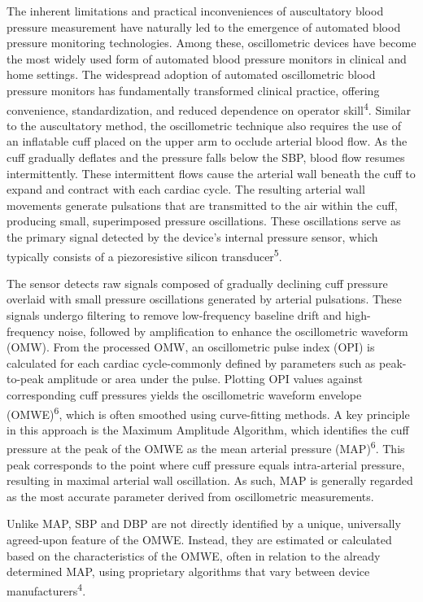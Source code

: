 \documentclass[
  12pt,
  letterpaper,
  openany,
  oneside]{book}
\begin{document}
The inherent limitations and practical inconveniences of auscultatory
blood pressure measurement have naturally led to the emergence of
automated blood pressure monitoring technologies. Among these,
oscillometric devices have become the most widely used form of automated
blood pressure monitors in clinical and home settings. The widespread
adoption of automated oscillometric blood pressure monitors has
fundamentally transformed clinical practice, offering convenience,
standardization, and reduced dependence on operator
skill\textsuperscript{4}. Similar to the auscultatory method, the
oscillometric technique also requires the use of an inflatable cuff
placed on the upper arm to occlude arterial blood flow. As the cuff
gradually deflates and the pressure falls below the SBP, blood flow
resumes intermittently. These intermittent flows cause the arterial wall
beneath the cuff to expand and contract with each cardiac cycle. The
resulting arterial wall movements generate pulsations that are
transmitted to the air within the cuff, producing small, superimposed
pressure oscillations. These oscillations serve as the primary signal
detected by the device's internal pressure sensor, which typically
consists of a piezoresistive silicon transducer\textsuperscript{5}.

The sensor detects raw signals composed of gradually declining cuff
pressure overlaid with small pressure oscillations generated by arterial
pulsations. These signals undergo filtering to remove low-frequency
baseline drift and high-frequency noise, followed by amplification to
enhance the oscillometric waveform (OMW). From the processed OMW, an
oscillometric pulse index (OPI) is calculated for each cardiac
cycle-commonly defined by parameters such as peak-to-peak amplitude or
area under the pulse. Plotting OPI values against corresponding cuff
pressures yields the oscillometric waveform envelope
(OMWE)\textsuperscript{6}, which is often smoothed using curve-fitting
methods. A key principle in this approach is the Maximum Amplitude
Algorithm, which identifies the cuff pressure at the peak of the OMWE as
the mean arterial pressure (MAP)\textsuperscript{6}. This peak
corresponds to the point where cuff pressure equals intra-arterial
pressure, resulting in maximal arterial wall oscillation. As such, MAP
is generally regarded as the most accurate parameter derived from
oscillometric measurements.

Unlike MAP, SBP and DBP are not directly identified by a unique,
universally agreed-upon feature of the OMWE. Instead, they are estimated
or calculated based on the characteristics of the OMWE, often in
relation to the already determined MAP, using proprietary algorithms
that vary between device manufacturers\textsuperscript{4}.
\end{document}
